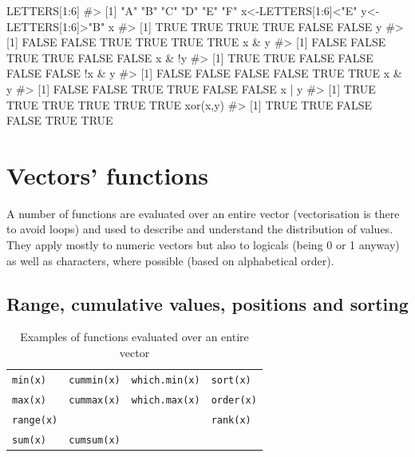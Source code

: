 \documentclass[
  letterpaper,
  DIV=11,
  numbers=noendperiod]{scrreprt}
\newenvironment{Shaded}{\begin{snugshade}}{\end{snugshade}}
\newcommand{\CommentTok}[1]{\textcolor[rgb]{0.37,0.37,0.37}{#1}}
\newcommand{\DecValTok}[1]{\textcolor[rgb]{0.68,0.00,0.00}{#1}}
\newcommand{\FunctionTok}[1]{\textcolor[rgb]{0.28,0.35,0.67}{#1}}
\newcommand{\NormalTok}[1]{\textcolor[rgb]{0.00,0.23,0.31}{#1}}
\newcommand{\OtherTok}[1]{\textcolor[rgb]{0.00,0.23,0.31}{#1}}
\newcommand{\SpecialCharTok}[1]{\textcolor[rgb]{0.37,0.37,0.37}{#1}}
\newcommand{\StringTok}[1]{\textcolor[rgb]{0.13,0.47,0.30}{#1}}
\begin{document}
\begin{Shaded}
\begin{Highlighting}[]
\NormalTok{LETTERS[}\DecValTok{1}\SpecialCharTok{:}\DecValTok{6}\NormalTok{]}
\CommentTok{\#\textgreater{} [1] "A" "B" "C" "D" "E" "F"}
\NormalTok{x}\OtherTok{\textless{}{-}}\NormalTok{LETTERS[}\DecValTok{1}\SpecialCharTok{:}\DecValTok{6}\NormalTok{]}\SpecialCharTok{\textless{}}\StringTok{"E"}
\NormalTok{y}\OtherTok{\textless{}{-}}\NormalTok{LETTERS[}\DecValTok{1}\SpecialCharTok{:}\DecValTok{6}\NormalTok{]}\SpecialCharTok{\textgreater{}}\StringTok{"B"}
\NormalTok{x}
\CommentTok{\#\textgreater{} [1]  TRUE  TRUE  TRUE  TRUE FALSE FALSE}
\NormalTok{y}
\CommentTok{\#\textgreater{} [1] FALSE FALSE  TRUE  TRUE  TRUE  TRUE}
\NormalTok{x }\SpecialCharTok{\&}\NormalTok{ y}
\CommentTok{\#\textgreater{} [1] FALSE FALSE  TRUE  TRUE FALSE FALSE}
\NormalTok{x }\SpecialCharTok{\&} \SpecialCharTok{!}\NormalTok{y}
\CommentTok{\#\textgreater{} [1]  TRUE  TRUE FALSE FALSE FALSE FALSE}
\SpecialCharTok{!}\NormalTok{x }\SpecialCharTok{\&}\NormalTok{ y}
\CommentTok{\#\textgreater{} [1] FALSE FALSE FALSE FALSE  TRUE  TRUE}
\NormalTok{x }\SpecialCharTok{\&}\NormalTok{ y}
\CommentTok{\#\textgreater{} [1] FALSE FALSE  TRUE  TRUE FALSE FALSE}
\NormalTok{x }\SpecialCharTok{|}\NormalTok{ y}
\CommentTok{\#\textgreater{} [1] TRUE TRUE TRUE TRUE TRUE TRUE}
\FunctionTok{xor}\NormalTok{(x,y)}
\CommentTok{\#\textgreater{} [1]  TRUE  TRUE FALSE FALSE  TRUE  TRUE}
\end{Highlighting}
\end{Shaded}

\section{Vectors' functions}\label{vectors-functions}

A number of functions are evaluated over an entire vector (vectorisation
is there to avoid loops) and used to describe and understand the
distribution of values. They apply mostly to numeric vectors but also to
logicals (being 0 or 1 anyway) as well as characters, where possible
(based on alphabetical order).

\subsection{Range, cumulative values, positions and
sorting}\label{range-cumulative-values-positions-and-sorting}

\begin{longtable}[]{@{}llll@{}}
\caption{Examples of functions evaluated over an entire
vector}\tabularnewline
\toprule\noalign{}
\endfirsthead
\endhead
\bottomrule\noalign{}
\endlastfoot
\texttt{min(x)} & \texttt{cummin(x)} & \texttt{which.min(x)} &
\texttt{sort(x)} \\
\texttt{max(x)} & \texttt{cummax(x)} & \texttt{which.max(x)} &
\texttt{order(x)} \\
\texttt{range(x)} & & & \texttt{rank(x)} \\
\texttt{sum(x)} & \texttt{cumsum(x)} & & \\
\end{longtable}
\end{document}
